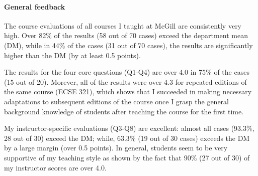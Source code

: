 \paragraph{General feedback}
The course evaluations of all courses I taught at McGill are consistently very high. Over 82\% of the results (58 out of 70 cases) exceed the department mean (DM), while in 44\% of the cases (31 out of 70 cases), the results are significantly higher than the DM (by at least 0.5 points). 

The results for the four core questions (Q1-Q4) are over 4.0 in 75\% of the cases (15 out of 20). Morever, all of the results 
were over 4.3 for repeated editions of the same course (ECSE 321), which shows that I succeeded in making necessary 
adaptations to subsequent editions of the course once I grasp the general background knowledge of students after teaching 
the course for the first time. 

My instructor-specific evaluations (Q3-Q8) are excellent: almost all cases (93.3\%, 28 out of 30) exceed the DM; while, 
63.3\% (19 out of 30 cases) exceeds the DM by a large margin (over 0.5 points).  In general, students seem to be very 
supportive of my teaching style as shown by the fact that 90\% (27 out of 30) of my instructor scores are over 4.0.


